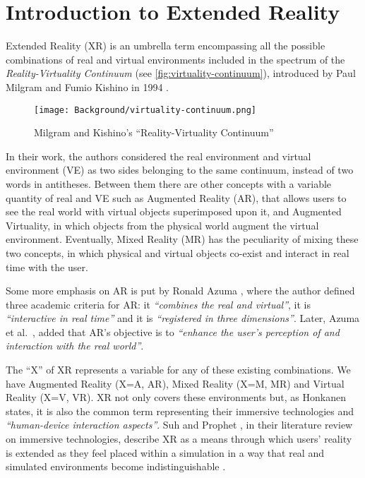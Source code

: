 \section{Introduction to Extended Reality}
\label{sec:background-intro}

Extended Reality (XR) is an umbrella term encompassing all the possible combinations of real and virtual environments included in the spectrum of the \emph{Reality-Virtuality Continuum} (see \autoref{fig:virtuality-continuum}), introduced by Paul Milgram and Fumio Kishino in 1994 \cite{milgram_taxonomy_1994}.

\begin{figure}[h]
	\centering
	\texttt{[image: Background/virtuality-continuum.png]}
	\caption{Milgram and Kishino's “Reality-Virtuality Continuum”}
	\label{fig:virtuality-continuum}
\end{figure}
In their work, the authors considered the real environment and virtual environment (VE) as two sides belonging to the same continuum, instead of two words in antitheses. Between them there are other concepts with a variable quantity of real and VE such as Augmented Reality (AR), that allows users to see the real world with virtual objects superimposed upon it, and Augmented Virtuality, in which objects from the physical world augment the virtual environment. Eventually, Mixed Reality (MR) has the peculiarity of mixing these two concepts, in which physical and virtual objects co-exist and interact in real time with the user.

Some more emphasis on AR is put by Ronald Azuma \cite{azuma1997survey}, where the author defined three academic criteria for AR: it \textit{“combines the real and virtual”}, it is \textit{“interactive in real time”} and it is \textit{“registered in three dimensions”}. Later, Azuma et al.~\cite{azuma2001recent}, added that AR's objective is to \textit{“enhance the user’s perception of and interaction with the real world”}.

The “X” of XR represents a variable for any of these existing combinations. We have Augmented Reality (X=A, AR), Mixed Reality (X=M, MR) and Virtual Reality (X=V, VR). XR not only covers these environments but, as Honkanen \cite{honkanen_enhancing_2018} states, it is also the common term representing their immersive technologies and \textit{“human-device interaction aspects”}. Suh and Prophet \cite{suh_state_2018}, in their literature review on immersive technologies, describe XR as a means through which users' reality is extended as they feel placed within a simulation in a way that real and simulated environments become indistinguishable \cite{kwok_covid-19_2020}.

